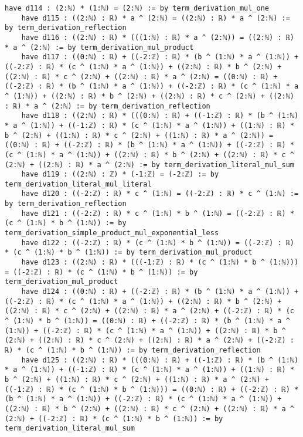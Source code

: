 \documentclass{article}
\begin{document}
\begin{tcolorbox}[colback=white!10, width=\linewidth]
\begin{lstlisting}[language=Lean4]
    have d114 : (2:ℕ) * (1:ℕ) = (2:ℕ) := by term_derivation_mul_one
    have d115 : ((2:ℕ) : ℝ) * a ^ (2:ℕ) = ((2:ℕ) : ℝ) * a ^ (2:ℕ) := by term_derivation_reflection
    have d116 : ((2:ℕ) : ℝ) * (((1:ℕ) : ℝ) * a ^ (2:ℕ)) = ((2:ℕ) : ℝ) * a ^ (2:ℕ) := by term_derivation_mul_product
    have d117 : ((0:ℕ) : ℝ) + ((-2:ℤ) : ℝ) * (b ^ (1:ℕ) * a ^ (1:ℕ)) + ((-2:ℤ) : ℝ) * (c ^ (1:ℕ) * a ^ (1:ℕ)) + ((2:ℕ) : ℝ) * b ^ (2:ℕ) + ((2:ℕ) : ℝ) * c ^ (2:ℕ) + ((2:ℕ) : ℝ) * a ^ (2:ℕ) = ((0:ℕ) : ℝ) + ((-2:ℤ) : ℝ) * (b ^ (1:ℕ) * a ^ (1:ℕ)) + ((-2:ℤ) : ℝ) * (c ^ (1:ℕ) * a ^ (1:ℕ)) + ((2:ℕ) : ℝ) * b ^ (2:ℕ) + ((2:ℕ) : ℝ) * c ^ (2:ℕ) + ((2:ℕ) : ℝ) * a ^ (2:ℕ) := by term_derivation_reflection
    have d118 : ((2:ℕ) : ℝ) * (((0:ℕ) : ℝ) + ((-1:ℤ) : ℝ) * (b ^ (1:ℕ) * a ^ (1:ℕ)) + ((-1:ℤ) : ℝ) * (c ^ (1:ℕ) * a ^ (1:ℕ)) + ((1:ℕ) : ℝ) * b ^ (2:ℕ) + ((1:ℕ) : ℝ) * c ^ (2:ℕ) + ((1:ℕ) : ℝ) * a ^ (2:ℕ)) = ((0:ℕ) : ℝ) + ((-2:ℤ) : ℝ) * (b ^ (1:ℕ) * a ^ (1:ℕ)) + ((-2:ℤ) : ℝ) * (c ^ (1:ℕ) * a ^ (1:ℕ)) + ((2:ℕ) : ℝ) * b ^ (2:ℕ) + ((2:ℕ) : ℝ) * c ^ (2:ℕ) + ((2:ℕ) : ℝ) * a ^ (2:ℕ) := by term_derivation_literal_mul_sum
    have d119 : ((2:ℕ) : ℤ) * (-1:ℤ) = (-2:ℤ) := by term_derivation_literal_mul_literal
    have d120 : ((-2:ℤ) : ℝ) * c ^ (1:ℕ) = ((-2:ℤ) : ℝ) * c ^ (1:ℕ) := by term_derivation_reflection
    have d121 : ((-2:ℤ) : ℝ) * c ^ (1:ℕ) * b ^ (1:ℕ) = ((-2:ℤ) : ℝ) * (c ^ (1:ℕ) * b ^ (1:ℕ)) := by term_derivation_simple_product_mul_exponential_less
    have d122 : ((-2:ℤ) : ℝ) * (c ^ (1:ℕ) * b ^ (1:ℕ)) = ((-2:ℤ) : ℝ) * (c ^ (1:ℕ) * b ^ (1:ℕ)) := by term_derivation_mul_product
    have d123 : ((2:ℕ) : ℝ) * (((-1:ℤ) : ℝ) * (c ^ (1:ℕ) * b ^ (1:ℕ))) = ((-2:ℤ) : ℝ) * (c ^ (1:ℕ) * b ^ (1:ℕ)) := by term_derivation_mul_product
    have d124 : ((0:ℕ) : ℝ) + ((-2:ℤ) : ℝ) * (b ^ (1:ℕ) * a ^ (1:ℕ)) + ((-2:ℤ) : ℝ) * (c ^ (1:ℕ) * a ^ (1:ℕ)) + ((2:ℕ) : ℝ) * b ^ (2:ℕ) + ((2:ℕ) : ℝ) * c ^ (2:ℕ) + ((2:ℕ) : ℝ) * a ^ (2:ℕ) + ((-2:ℤ) : ℝ) * (c ^ (1:ℕ) * b ^ (1:ℕ)) = ((0:ℕ) : ℝ) + ((-2:ℤ) : ℝ) * (b ^ (1:ℕ) * a ^ (1:ℕ)) + ((-2:ℤ) : ℝ) * (c ^ (1:ℕ) * a ^ (1:ℕ)) + ((2:ℕ) : ℝ) * b ^ (2:ℕ) + ((2:ℕ) : ℝ) * c ^ (2:ℕ) + ((2:ℕ) : ℝ) * a ^ (2:ℕ) + ((-2:ℤ) : ℝ) * (c ^ (1:ℕ) * b ^ (1:ℕ)) := by term_derivation_reflection
    have d125 : ((2:ℕ) : ℝ) * (((0:ℕ) : ℝ) + ((-1:ℤ) : ℝ) * (b ^ (1:ℕ) * a ^ (1:ℕ)) + ((-1:ℤ) : ℝ) * (c ^ (1:ℕ) * a ^ (1:ℕ)) + ((1:ℕ) : ℝ) * b ^ (2:ℕ) + ((1:ℕ) : ℝ) * c ^ (2:ℕ) + ((1:ℕ) : ℝ) * a ^ (2:ℕ) + ((-1:ℤ) : ℝ) * (c ^ (1:ℕ) * b ^ (1:ℕ))) = ((0:ℕ) : ℝ) + ((-2:ℤ) : ℝ) * (b ^ (1:ℕ) * a ^ (1:ℕ)) + ((-2:ℤ) : ℝ) * (c ^ (1:ℕ) * a ^ (1:ℕ)) + ((2:ℕ) : ℝ) * b ^ (2:ℕ) + ((2:ℕ) : ℝ) * c ^ (2:ℕ) + ((2:ℕ) : ℝ) * a ^ (2:ℕ) + ((-2:ℤ) : ℝ) * (c ^ (1:ℕ) * b ^ (1:ℕ)) := by term_derivation_literal_mul_sum

\end{lstlisting}
\end{tcolorbox}
\end{document}

